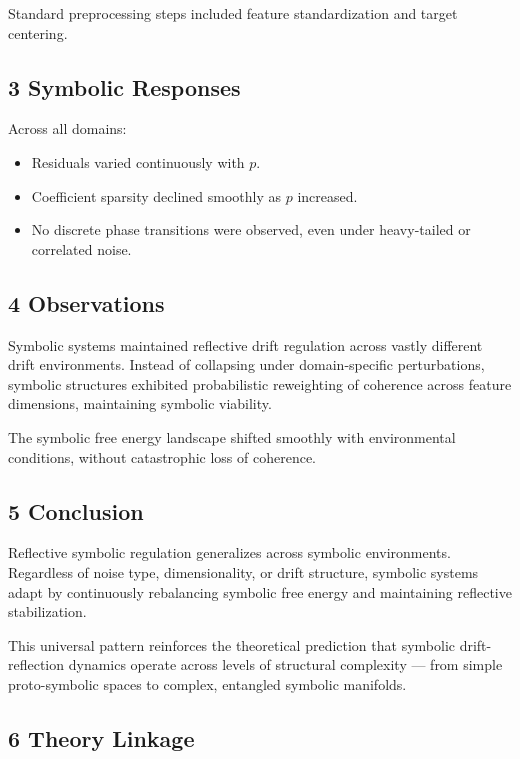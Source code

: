 Standard preprocessing steps included feature standardization and target centering.

\subsection*{3 Symbolic Responses}
\label{subsection:trace5_symbolic_responses}

Across all domains:
\begin{itemize}
    \item Residuals varied continuously with $p$.
    \item Coefficient sparsity declined smoothly as $p$ increased.
    \item No discrete phase transitions were observed, even under heavy-tailed or correlated noise.
\end{itemize}

\subsection*{4 Observations}
\label{subsection:trace5_observations}

Symbolic systems maintained reflective drift regulation across vastly different drift environments. Instead of collapsing under domain-specific perturbations, symbolic structures exhibited probabilistic reweighting of coherence across feature dimensions, maintaining symbolic viability.

The symbolic free energy landscape shifted smoothly with environmental conditions, without catastrophic loss of coherence.

\subsection*{5 Conclusion}
\label{subsection:trace5_conclusion}

Reflective symbolic regulation generalizes across symbolic environments. Regardless of noise type, dimensionality, or drift structure, symbolic systems adapt by continuously rebalancing symbolic free energy and maintaining reflective stabilization.

This universal pattern reinforces the theoretical prediction that symbolic drift-reflection dynamics operate across levels of structural complexity — from simple proto-symbolic spaces to complex, entangled symbolic manifolds.

\subsection*{6 Theory Linkage}
\label{subsection:trace5_theory_linkage}

